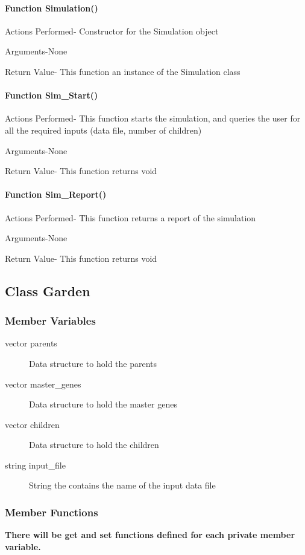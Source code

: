 \documentclass{article}
\begin{document}
\paragraph{Function Simulation()}
 Actions Performed- Constructor for the Simulation object
                 
Arguments-None
                    
Return Value- This function an instance of the Simulation class

\paragraph{Function Sim\_Start()}
Actions Performed- This function starts the simulation, and queries the user for all the required inputs (data file, number of children)
                 
Arguments-None
                    
Return Value- This function returns void

\paragraph{Function Sim\_Report()}
Actions Performed- This function returns a report of the simulation
                 
Arguments-None
                    
Return Value- This function returns void

\newpage
\subsection{Class Garden}
\subsubsection{Member Variables}
\begin{description}
\item[vector parents] Data structure to hold the parents
\item[vector master\_genes] Data structure to hold the master genes
\item[vector children] Data structure to hold the children
\item[string input\_file] String the contains the name of the input data file
\end{description}
\subsubsection{Member Functions}
\textbf{There will be get and set functions defined for each private member variable.}
\end{document}
